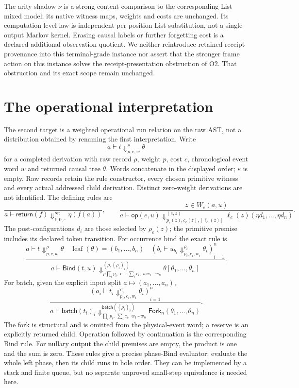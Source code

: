 \documentclass[11pt,a4paper]{article}
\theoremstyle{definition}
\newcommand{\leaf}{\operatorname{leaf}}
\begin{document}
The arity shadow $\nu$ is a strong content comparison to the corresponding
List mixed model; its native witness maps, weights and costs are unchanged.
Its computation-level law is independent per-position List substitution,
not a single-output Markov kernel. Erasing causal labels or further
forgetting cost is a declared additional observation quotient. We neither
reintroduce retained receipt provenance into this terminal-grade instance
nor assert that the stronger frame action on this instance solves the
receipt-presentation obstruction of O2. That obstruction and its exact
scope remain unchanged.

\section{The operational interpretation}\label{sec:operational}
The second target is a weighted operational run relation on the raw AST,
not a distribution obtained by renaming the first interpretation. Write
\[
 a\vdash t\Downarrow^{\rho}_{p,c,w}\theta
\]
for a completed derivation with raw record $\rho$, weight $p$, cost $c$,
chronological event word $w$ and returned causal tree $\theta$.
Words concatenate in the displayed order; $\varepsilon$ is empty.
Raw records retain the rule constructor, every chosen primitive witness and
every actual addressed child derivation. Distinct zero-weight derivations
are not identified. The defining rules are
\[
 \frac{}{a\vdash\mathsf{return}(f)
   \Downarrow^{\mathsf{ret}}_{1,0,\varepsilon}\eta(f(a))},
 \qquad
 \frac{z\in W_e(a,u)}
 {a\vdash\mathsf{op}(e,u)\Downarrow^{(e,z)}_{p_e(z),c_e(z),[\ell_e(z)]}
       \ell_e(z)(\eta d_1,\ldots,\eta d_n)}.
\]
The post-configurations $d_i$ are those selected by $\rho_e(z)$; the
primitive premise includes its declared token transition. For occurrence
bind the exact rule is
\begin{equation}\label{eq:run-bind}
 \frac{a\vdash t\Downarrow^{\rho}_{p,c,w}\theta
       \quad \leaf(\theta)=(b_1,\ldots,b_n)
       \quad (b_i\vdash u_{b_i}\Downarrow^{\rho_i}_{p_i,c_i,w_i}\theta_i)_{i=1}^n}
 {a\vdash\mathsf{Bind}(t,u)
       \Downarrow^{(\rho,(\rho_i)_i)}_{p\prod_i p_i,\ c+\sum_i c_i,\ ww_1\cdots w_n}
       \theta[\theta_1,\ldots,\theta_n]}.
\end{equation}
For batch, given the explicit input split $a\mapsto(a_1,\ldots,a_n)$,
\begin{equation}\label{eq:run-batch}
 \frac{(a_i\vdash t_i\Downarrow^{\rho_i}_{p_i,c_i,w_i}\theta_i)_{i=1}^n}
 {a\vdash\mathsf{batch}(t_i)_i
       \Downarrow^{\mathsf{batch}((\rho_i)_i)}_{\prod_i p_i,\ \sum_i c_i,\ w_1\cdots w_n}
       \mathsf{Fork}_n(\theta_1,\ldots,\theta_n)}.
\end{equation}
The fork is structural and is omitted from the physical-event word; a
reserve is an explicitly returned child. Operation followed by continuation
is the corresponding Bind rule. For nullary output the child premises are
empty, the product is one and the sum is zero. These rules give a precise
phase-Bind evaluator: evaluate the whole left phase, then its child runs
in hole order. They can be implemented by a stack and finite queue, but
no separate unproved small-step equivalence is needed here.
\end{document}
